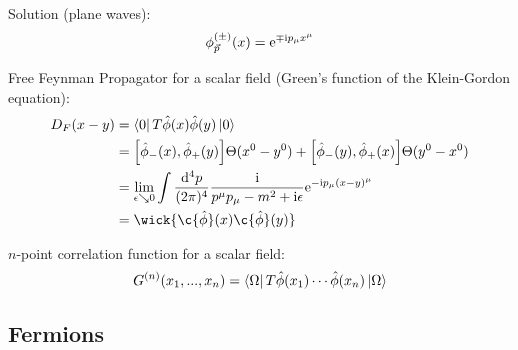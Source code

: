 			\noindent
			Solution (plane waves):
			\begin{equation}
				{\phi}^{ ( \pm ) }_{\vec{p}} (x) = \ex^{\mp \i p_\mu x^\mu}
			\end{equation}

			\noindent
			Free Feynman Propagator for a scalar field (\ie Green's function of the Klein-Gordon equation):
			\begin{equation}
				\begin{aligned}
					D_F (x-y) 
					&= \Bra{0} T \hat{\phi}(x)\hat{\phi}(y) \Ket{0} \\
					&= \comm{\hat{\phi}_{-}(x)}{\hat{\phi}_{+}(y)} \Theta(x^0-y^0) + \comm{\hat{\phi}_{-}(y)}{\hat{\phi}_{+}(x)} \Theta(y^0-x^0) \\
					&= \lim_{\epsilon \searrow 0} \int \frac{\dd^4 p}{(2\pi)^4} \frac{\i}{p^\mu p_\mu - m^2 + \i \epsilon} \ex^{-\i p_\mu (x-y)^\mu} \\
					&= \wick{\c{\hat{\phi}}(x) \c{\hat{\phi}}(y)} \\
				\end{aligned}
			\end{equation}

			\noindent
			$n$-point correlation function for a scalar field:
			\begin{equation}
				G^{(n)}(x_1, ..., x_n) = \Bra{\Omega} T \hat{\phi}(x_1) \dotsb \hat{\phi}(x_n) \Ket{\Omega}
			\end{equation}

					
	\subsection{Fermions}
